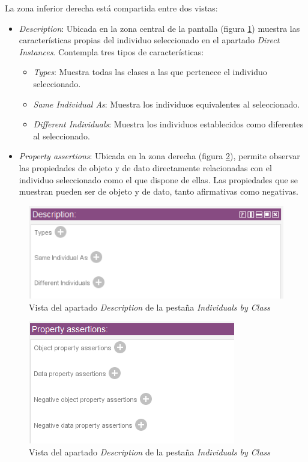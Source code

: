 La zona inferior derecha está compartida entre dos vistas: 

\begin{itemize}
    \item \textit{Description}: Ubicada en la zona central de la pantalla (figura \ref*{IndividualClass_description}) muestra las características propias del 
    individuo seleccionado en el apartado \textit{Direct Instances}. Contempla tres tipos de características:
    \begin{itemize}
        \item \textit{Types}: Muestra todas las clases a las que pertenece el individuo seleccionado.
        \item \textit{Same Individual As}: Muestra los individuos equivalentes al seleccionado.
        \item \textit{Different Individuals}: Muestra los individuos establecidos como diferentes al seleccionado.
    \end{itemize}

    \item \textit{Property assertions}: Ubicada en la zona derecha (figura \ref*{IndividualClass_assertions}), permite observar 
    las propiedades de objeto y de dato directamente relacionadas con el individuo seleccionado como el que dispone de ellas. 
    Las propiedades que se muestran pueden ser de objeto y de dato, tanto afirmativas como negativas.

\end{itemize}


\begin{figure}[ht]
    \centering
    \includegraphics[scale=0.6]{Figures/Protege/IndividualsClass_description.png}
    \caption{Vista del apartado \textit{Description} de la pestaña \textit{Individuals by Class}}
    \label{IndividualClass_description}
\end{figure}


\begin{figure}[ht]
    \centering
    \includegraphics[scale=0.6]{Figures/Protege/IndividualsClass_assertions.png}
    \caption{Vista del apartado \textit{Description} de la pestaña \textit{Individuals by Class}}
    \label{IndividualClass_assertions}
\end{figure}